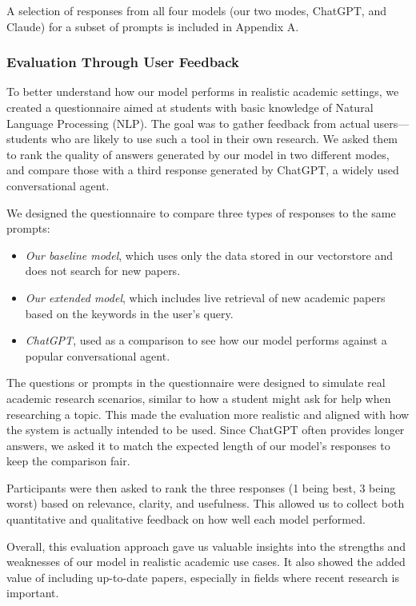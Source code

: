 \documentclass[fleqn,moreauthors,10pt]{ds_report}
\begin{document}
A selection of responses from all four models (our two modes, ChatGPT, and Claude) for a subset of prompts is included in Appendix A.

\subsubsection*{Evaluation Through User Feedback}

To better understand how our model performs in realistic academic settings, we created a questionnaire aimed at students with basic knowledge of Natural Language Processing (NLP). The goal was to gather feedback from actual users—students who are likely to use such a tool in their own research. We asked them to rank the quality of answers generated by our model in two different modes, and compare those with a third response generated by ChatGPT, a widely used conversational agent.

We designed the questionnaire to compare three types of responses to the same prompts:

\begin{itemize}
  \item \textit{Our baseline model}, which uses only the data stored in our vectorstore and does not search for new papers.
  \item \textit{Our extended model}, which includes live retrieval of new academic papers based on the keywords in the user's query.
  \item \textit{ChatGPT}, used as a comparison to see how our model performs against a popular conversational agent.
\end{itemize}

The questions or prompts in the questionnaire were designed to simulate real academic research scenarios, similar to how a student might ask for help when researching a topic. This made the evaluation more realistic and aligned with how the system is actually intended to be used. Since ChatGPT often provides longer answers, we asked it to match the expected length of our model’s responses to keep the comparison fair.

Participants were then asked to rank the three responses (1 being best, 3 being worst) based on relevance, clarity, and usefulness. This allowed us to collect both quantitative and qualitative feedback on how well each model performed.

Overall, this evaluation approach gave us valuable insights into the strengths and weaknesses of our model in realistic academic use cases. It also showed the added value of including up-to-date papers, especially in fields where recent research is important.
\end{document}
